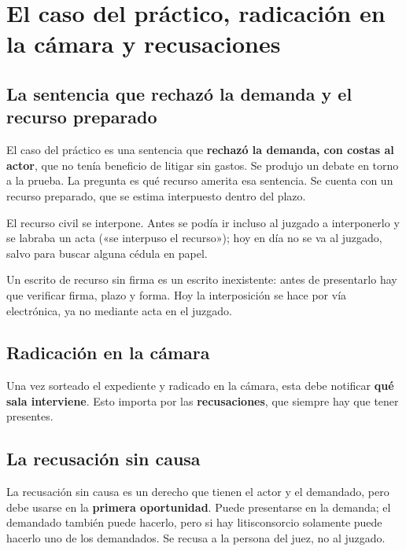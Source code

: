\documentclass[12pt,oneside]{book}
\begin{document}
\chapter[Caso del práctico y recusaciones]{El caso del práctico, radicación en la cámara y recusaciones}

\section{La sentencia que rechazó la demanda y el recurso preparado}

El caso del práctico es una sentencia que \textbf{rechazó la demanda, con costas al actor}, que no tenía beneficio de litigar sin gastos. Se produjo un debate en torno a la prueba. La pregunta es qué recurso amerita esa sentencia. Se cuenta con un recurso preparado, que se estima interpuesto dentro del plazo.

El recurso civil se interpone. Antes se podía ir incluso al juzgado a interponerlo y se labraba un acta («se interpuso el recurso»); hoy en día no se va al juzgado, salvo para buscar alguna cédula en papel.

\begin{important}
Un escrito de recurso sin firma es un escrito inexistente: antes de presentarlo hay que verificar firma, plazo y forma. Hoy la interposición se hace por vía electrónica, ya no mediante acta en el juzgado.
\end{important}

\section{Radicación en la cámara}

Una vez sorteado el expediente y radicado en la cámara, esta debe notificar \textbf{qué sala interviene}. Esto importa por las \textbf{recusaciones}, que siempre hay que tener presentes.

\section{La recusación sin causa}

La recusación sin causa es un derecho que tienen el actor y el demandado, pero debe usarse en la \textbf{primera oportunidad}. Puede presentarse en la demanda; el demandado también puede hacerlo, pero si hay litisconsorcio solamente puede hacerlo uno de los demandados. Se recusa a la persona del juez, no al juzgado.
\end{document}
